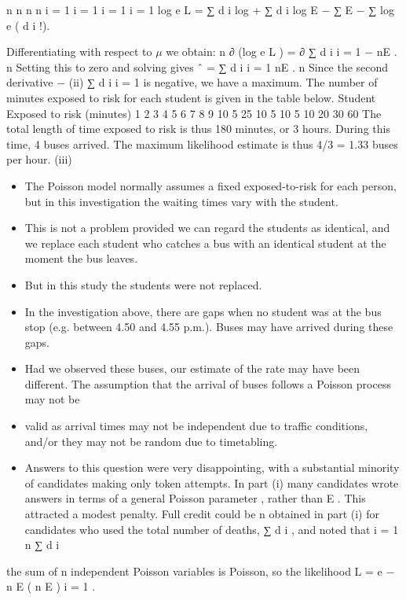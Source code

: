 \documentclass[a4paper,12pt]{article}
\begin{document}
\begin{enumerate}
n n n n
i = 1 i = 1 i = 1 i = 1
log e L = ∑ d i log \mu + ∑ d i log E − ∑ E \mu − ∑ log e ( d i !).

Differentiating with respect to $\mu$ we obtain:
n
∂ (log e L )
=
∂\mu
∑ d i
i = 1
\mu
− nE .
n
Setting this to zero and solving gives \mu ˆ =
∑ d i
i = 1
nE
.
n
Since the second derivative −
(ii)
∑ d i
i = 1
is negative, we have a maximum.
The number of minutes exposed to risk for each student is given in the table
below.
Student Exposed to risk (minutes)
1
2
3
4
5
6
7
8
9
10 5
25
10
5
10
5
10
20
30
60
The total length of time exposed to risk is thus 180 minutes, or 3 hours.
During this time, 4 buses arrived.
The maximum likelihood estimate is thus 4/3 = 1.33 buses per hour.
(iii)
\begin{itemize}
\item The Poisson model normally assumes a fixed exposed-to-risk for each person, but in this investigation the waiting times vary with the student.
\item This is not a problem provided we can regard the students as identical, and we replace each student who catches a bus with an identical student at the moment the bus leaves.
\item But in this study the students were not replaced.
\item In the investigation above, there are gaps when no student was at the bus stop (e.g. between 4.50 and 4.55 p.m.). Buses may have arrived during these gaps.
\item 
Had we observed these buses, our estimate of the rate may have been different.
The assumption that the arrival of buses follows a Poisson process may not be
\item valid as arrival times may not be independent due to traffic conditions, and/or
they may not be random due to timetabling.
\item Answers to this question were very disappointing, with a substantial minority of candidates
making only token attempts. In part (i) many candidates wrote answers in terms of a general
Poisson parameter \lambda, rather than \mu E . This attracted a modest penalty. Full credit could be
n
obtained in part (i) for candidates who used the total number of deaths, ∑ d i , and noted that
i = 1
n
∑ d i
\end{itemize}
the sum of n independent Poisson variables is Poisson, so the likelihood L = e − n \mu E ( n \mu E ) i = 1 .



\end{enumerate}
\end{document}
